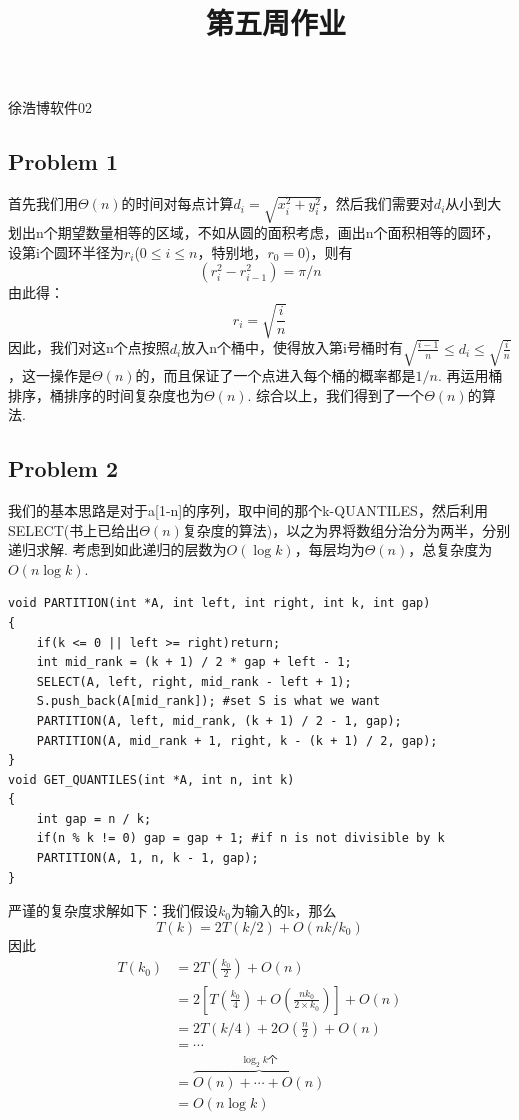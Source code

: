 \documentclass[UTF8]{ctexart}
\begin{document}
\renewcommand{\thefootnote}{\fnsymbol{footnote}}
\linespread{1.4}
\title{\vspace{-5em}\ \ 第五周作业\vspace{-2.5em}}
\date{}
\maketitle
\begin{center}
{\fangsong 徐浩博\quad 软件02}
\end{center}


\subsection*{Problem 1}
首先我们用$\Theta(n)$的时间对每点计算$d_i=\sqrt{x_i^2+y_i^2}$，然后我们需要对$d_i$从小到大划出n个期望数量相等的区域，不如从圆的面积考虑，画出n个面积相等的圆环，设第i个圆环半径为$r_i$($0 \leq i\leq n$，特别地，$r_0=0$)，则有
$$(r_i^2-r_{i-1}^2)=\pi/n$$
由此得：
$$r_i=\sqrt{\frac{i}{n}}$$
因此，我们对这n个点按照$d_i$放入n个桶中，使得放入第i号桶时有$\sqrt{\frac{i-1}{n}}\leq d_i\leq\sqrt{\frac{i}{n}}$，这一操作是$\Theta(n)$的，而且保证了一个点进入每个桶的概率都是$1/n$. 再运用桶排序，桶排序的时间复杂度也为$\Theta(n)$. 综合以上，我们得到了一个$\Theta(n)$的算法.


\subsection*{Problem 2}
我们的基本思路是对于a[1-n]的序列，取中间的那个k-QUANTILES，然后利用SELECT(书上已给出$\Theta(n)$复杂度的算法)，以之为界将数组分治分为两半，分别递归求解. 考虑到如此递归的层数为$O(\log k)$，每层均为$\Theta(n)$，总复杂度为$O(n\log k)$.
\begin{lstlisting}[mathescape=true]
void PARTITION(int *A, int left, int right, int k, int gap)
{
	if(k <= 0 || left >= right)return;
	int mid_rank = (k + 1) / 2 * gap + left - 1;
	SELECT(A, left, right, mid_rank - left + 1);
	S.push_back(A[mid_rank]); #set S is what we want
	PARTITION(A, left, mid_rank, (k + 1) / 2 - 1, gap);
	PARTITION(A, mid_rank + 1, right, k - (k + 1) / 2, gap);
}
void GET_QUANTILES(int *A, int n, int k)
{
	int gap = n / k;
	if(n % k != 0) gap = gap + 1; #if n is not divisible by k
	PARTITION(A, 1, n, k - 1, gap);
}
\end{lstlisting}
严谨的复杂度求解如下：我们假设$k_0$为输入的k，那么
$$T(k) = 2T(k/2) + O(nk/k_0)$$
因此
\begin{align*}
	T(k_0)&= 2T(\frac{k_0}{2}) + O(n)\\
	&=2[T(\frac{k_0}{4})+O(\frac{nk_0}{2\times k_0})]+O(n)\\
&=2T(k/4)+2O(\frac{n}{2})+O(n)\\
&=\cdots\\
&=\overbrace{O(n)+\cdots+O(n)}^{\log_2k\textbf{个}}\\
&=O(n\log k)
\end{align*}
\end{document}

